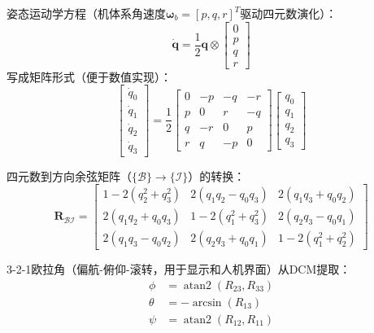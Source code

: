 \documentclass[a4paper,12pt]{ctexart}
\theoremstyle{plain}
\theoremstyle{definition}
\begin{document}
姿态运动学方程（机体系角速度$\bm{\omega}_b = [p, q, r]^T$驱动四元数演化）：
\begin{equation}
    \dot{\bm{q}} = \frac{1}{2} \bm{q} \otimes
    \begin{bmatrix} 0 \\ p \\ q \\ r \end{bmatrix}
    \label{eq:quaternion_kinematics}
\end{equation}
写成矩阵形式（便于数值实现）：
\begin{equation}
    \begin{bmatrix} \dot{q}_0 \\ \dot{q}_1 \\ \dot{q}_2 \\ \dot{q}_3 \end{bmatrix}
    = \frac{1}{2}
    \begin{bmatrix}
        0 & -p & -q & -r \\
        p &  0 &  r & -q \\
        q & -r &  0 &  p \\
        r &  q & -p &  0
    \end{bmatrix}
    \begin{bmatrix} q_0 \\ q_1 \\ q_2 \\ q_3 \end{bmatrix}
    \label{eq:quaternion_matrix}
\end{equation}

四元数到方向余弦矩阵（$\{\mathcal{B}\}\to\{\mathcal{I}\}$）的转换：
\begin{equation}
    \bm{R}_{\mathcal{B}\mathcal{I}} =
    \begin{bmatrix}
        1-2(q_2^2+q_3^2) & 2(q_1 q_2 - q_0 q_3) & 2(q_1 q_3 + q_0 q_2) \\
        2(q_1 q_2 + q_0 q_3) & 1-2(q_1^2+q_3^2) & 2(q_2 q_3 - q_0 q_1) \\
        2(q_1 q_3 - q_0 q_2) & 2(q_2 q_3 + q_0 q_1) & 1-2(q_1^2+q_2^2)
    \end{bmatrix}
    \label{eq:dcm_from_quaternion}
\end{equation}

3-2-1欧拉角（偏航-俯仰-滚转，用于显示和人机界面）从DCM提取：
\begin{equation}
    \begin{aligned}
        \phi &= \operatorname{atan2}(R_{23}, R_{33}) \\
        \theta &= -\arcsin(R_{13}) \\
        \psi &= \operatorname{atan2}(R_{12}, R_{11})
    \end{aligned}
    \label{eq:euler_from_dcm}
\end{equation}
\end{document}
